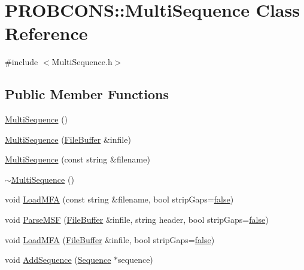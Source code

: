 \hypertarget{class_p_r_o_b_c_o_n_s_1_1_multi_sequence}{\section{P\+R\+O\+B\+C\+O\+N\+S\+:\+:Multi\+Sequence Class Reference}
\label{class_p_r_o_b_c_o_n_s_1_1_multi_sequence}
}


{\ttfamily \#include $<$Multi\+Sequence.\+h$>$}

\subsection*{Public Member Functions}
\begin{DoxyCompactItemize}
\item 
\hyperlink{class_p_r_o_b_c_o_n_s_1_1_multi_sequence_aed52d4ebab4d87735ddde9aa683f4320}{Multi\+Sequence} ()
\item 
\hyperlink{class_p_r_o_b_c_o_n_s_1_1_multi_sequence_a0cd5e44071400d79055894d4f8558cc6}{Multi\+Sequence} (\hyperlink{class_p_r_o_b_c_o_n_s_1_1_file_buffer}{File\+Buffer} \&infile)
\item 
\hyperlink{class_p_r_o_b_c_o_n_s_1_1_multi_sequence_a741ade6a9f236eb2aadf44d470a2080a}{Multi\+Sequence} (const string \&filename)
\item 
\hyperlink{class_p_r_o_b_c_o_n_s_1_1_multi_sequence_a20f9c7a0160accf486fd2b8f9c43df15}{$\sim$\+Multi\+Sequence} ()
\item 
void \hyperlink{class_p_r_o_b_c_o_n_s_1_1_multi_sequence_ab79150d9a4fe884edd526a1e10a4b2f5}{Load\+M\+F\+A} (const string \&filename, bool strip\+Gaps=\hyperlink{naview_8c_a65e9886d74aaee76545e83dd09011727}{false})
\item 
void \hyperlink{class_p_r_o_b_c_o_n_s_1_1_multi_sequence_a038aaf086505d203933df6c4dca52532}{Parse\+M\+S\+F} (\hyperlink{class_p_r_o_b_c_o_n_s_1_1_file_buffer}{File\+Buffer} \&infile, string header, bool strip\+Gaps=\hyperlink{naview_8c_a65e9886d74aaee76545e83dd09011727}{false})
\item 
void \hyperlink{class_p_r_o_b_c_o_n_s_1_1_multi_sequence_a0b795e672b92aa15093cde66f9cfe114}{Load\+M\+F\+A} (\hyperlink{class_p_r_o_b_c_o_n_s_1_1_file_buffer}{File\+Buffer} \&infile, bool strip\+Gaps=\hyperlink{naview_8c_a65e9886d74aaee76545e83dd09011727}{false})
\item 
void \hyperlink{class_p_r_o_b_c_o_n_s_1_1_multi_sequence_a36f54bcbd04cdc76b8210c78f3450c1c}{Add\+Sequence} (\hyperlink{class_p_r_o_b_c_o_n_s_1_1_sequence}{Sequence} $\ast$sequence)

\end{DoxyCompactItemize}
